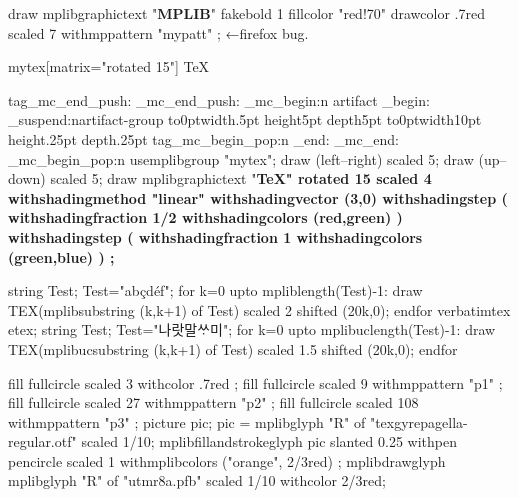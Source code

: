 \documentclass[a4paper]{article}
\begin{document}
\bigskip
\noindent
\mpfig[text]
  draw mplibgraphictext "\textbf{MPLIB}"
    fakebold 1 fillcolor "red!70" drawcolor .7red scaled 7
    withmppattern "mypatt" ;
\endmpfig
←firefox bug.

\leavevmode
\begin{mplibgroup}{mytex}[matrix="rotated 15"] \SuspendTagging{}\TeX \end{mplibgroup}%
  \ExplSyntaxOn
  \ifcsname tag_mc_end_push:\endcsname
  \tag_mc_end_push:
  \tag_mc_begin:n {artifact}
  \group_begin:
  \tag_suspend:n{artifact-group}
  \fi
\hbox to0pt{\hss\vrule width.5pt height5pt depth5pt\hss}%
\hbox to0pt{\hss\vrule width10pt height.25pt depth.25pt\hss}%
  \ifcsname tag_mc_begin_pop:n\endcsname
  \group_end:
  \tag_mc_end:
  \tag_mc_begin_pop:n{}
  \fi
  \ExplSyntaxOff
{}%
\mpfig[actualtext=TeX] usemplibgroup "mytex"; draw (left--right) scaled 5; draw (up--down) scaled 5; \endmpfig
\mpfig[text]
  draw mplibgraphictext "\bfseries\TeX" rotated 15 scaled 4
    withshadingmethod "linear"
    withshadingvector (3,0)
    withshadingstep (
      withshadingfraction 1/2
      withshadingcolors (red,green)
    )
    withshadingstep (
      withshadingfraction 1
      withshadingcolors (green,blue)
    )
    ;
\endmpfig

\leavevmode
\mpfig[off]
  string Test; Test="abçdéf";
  for k=0 upto mpliblength(Test)-1:
    draw TEX(mplibsubstring (k,k+1) of Test) scaled 2 shifted (20k,0);
  endfor
\endmpfig
\qquad
{}%
\begingroup\ifdefined\tagpdfsetup{}\fi
\mpfig[actualtext=나랏말씀이]
  verbatimtex \hangulfont etex;
  string Test; Test="나랏말ᄊᆞ미";
  for k=0 upto mplibuclength(Test)-1:
    draw TEX(mplibucsubstring (k,k+1) of Test) scaled 1.5 shifted (20k,0);
  endfor
\endmpfig
\endgroup

\mplibforcehmode
{}
  \mpfig[off]
    fill fullcircle scaled 3
    withcolor .7red
    ;
  \endmpfig
\endmppattern
{}
  \mpfig[off]
    fill fullcircle scaled 9
    withmppattern "p1"
    ;
  \endmpfig
\endmppattern
{}
  \mpfig[off]
    fill fullcircle scaled 27
    withmppattern "p2"
    ;
  \endmpfig
\endmppattern
\mpfig[alt=testing nested pattern]
  fill fullcircle scaled 108
  withmppattern "p3"
  ;
\endmpfig
\mpfig
picture pic;
pic = mplibglyph "R" of "texgyrepagella-regular.otf" scaled 1/10;
mplibfillandstrokeglyph pic
  slanted 0.25
  withpen pencircle scaled 1
  withmplibcolors ("orange", 2/3red)
  ;
\endmpfig
\mpfig
  mplibdrawglyph mplibglyph "R" of "utmr8a.pfb" scaled 1/10 withcolor 2/3red;
\endmpfig
\end{document}
